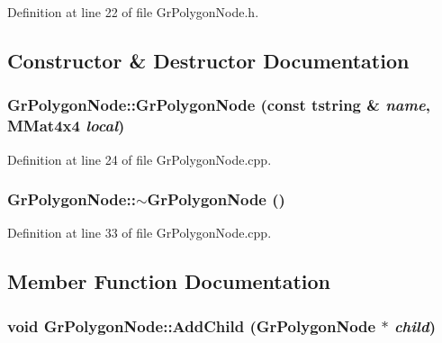 Definition at line 22 of file GrPolygonNode.h.

\subsection{Constructor \& Destructor Documentation}
\hypertarget{class_gr_polygon_node_e8a0d612ed6daab17578b3d097f9f78a}{
\subsubsection[{GrPolygonNode}]{\setlength{\rightskip}{0pt plus 5cm}GrPolygonNode::GrPolygonNode (const {\bf tstring} \& {\em name}, \/  {\bf MMat4x4} {\em local})}}
\label{class_gr_polygon_node_e8a0d612ed6daab17578b3d097f9f78a}




Definition at line 24 of file GrPolygonNode.cpp.\hypertarget{class_gr_polygon_node_330ca71f7d551038be453677ef25ac4c}{
\subsubsection[{$\sim$GrPolygonNode}]{\setlength{\rightskip}{0pt plus 5cm}GrPolygonNode::$\sim$GrPolygonNode ()}}
\label{class_gr_polygon_node_330ca71f7d551038be453677ef25ac4c}




Definition at line 33 of file GrPolygonNode.cpp.

\subsection{Member Function Documentation}
\hypertarget{class_gr_polygon_node_40ec07561c3e0e3b60b61b87e3f09250}{
\subsubsection[{AddChild}]{\setlength{\rightskip}{0pt plus 5cm}void GrPolygonNode::AddChild ({\bf GrPolygonNode} $\ast$ {\em child})}}
\label{class_gr_polygon_node_40ec07561c3e0e3b60b61b87e3f09250}





